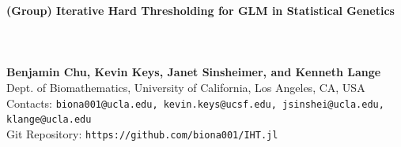 \documentclass[a0,portrait]{a0poster}
\begin{document}



\begin{minipage}[b]{0.80\linewidth}
\veryHuge \color{NavyBlue} \textbf{(Group) Iterative Hard Thresholding for GLM in Statistical Genetics}\\
\\
\\
\\
\color{Black} %
\noindent \huge \textbf{Benjamin Chu, Kevin Keys, Janet Sinsheimer, and Kenneth Lange}\\[0.5cm] %
\huge Dept. of Biomathematics, University of California, Los Angeles, CA, USA\\[0.4cm]
\normalsize 
Contacts: \texttt{biona001@ucla.edu, kevin.keys@ucsf.edu, jsinshei@ucla.edu,  klange@ucla.edu} \\
Git Repository: \texttt{https://github.com/biona001/IHT.jl} \\
\end{minipage}
%
\end{document}
